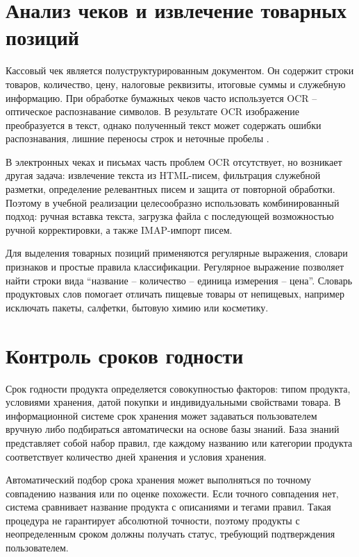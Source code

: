 \documentclass[14pt,a4paper]{extreport}
\begin{document}
\section{Анализ чеков и извлечение товарных позиций}

Кассовый чек является полуструктурированным документом. Он содержит строки товаров, количество, цену, налоговые реквизиты, итоговые суммы и служебную информацию. При обработке бумажных чеков часто используется OCR -- оптическое распознавание символов. В результате OCR изображение преобразуется в текст, однако полученный текст может содержать ошибки распознавания, лишние переносы строк и неточные пробелы \cite{ocrbook}.

В электронных чеках и письмах часть проблем OCR отсутствует, но возникает другая задача: извлечение текста из HTML-писем, фильтрация служебной разметки, определение релевантных писем и защита от повторной обработки. Поэтому в учебной реализации целесообразно использовать комбинированный подход: ручная вставка текста, загрузка файла с последующей возможностью ручной корректировки, а также IMAP-импорт писем.

Для выделения товарных позиций применяются регулярные выражения, словари признаков и простые правила классификации. Регулярное выражение позволяет найти строки вида ``название -- количество -- единица измерения -- цена''. Словарь продуктовых слов помогает отличать пищевые товары от непищевых, например исключать пакеты, салфетки, бытовую химию или косметику.

\section{Контроль сроков годности}

Срок годности продукта определяется совокупностью факторов: типом продукта, условиями хранения, датой покупки и индивидуальными свойствами товара. В информационной системе срок хранения может задаваться пользователем вручную либо подбираться автоматически на основе базы знаний. База знаний представляет собой набор правил, где каждому названию или категории продукта соответствует количество дней хранения и условия хранения.

Автоматический подбор срока хранения может выполняться по точному совпадению названия или по оценке похожести. Если точного совпадения нет, система сравнивает название продукта с описаниями и тегами правил. Такая процедура не гарантирует абсолютной точности, поэтому продукты с неопределенным сроком должны получать статус, требующий подтверждения пользователем.
\end{document}
